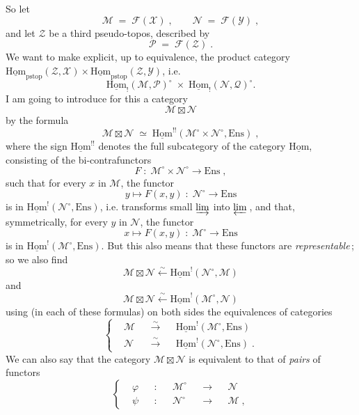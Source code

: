 \documentclass[11pt]{article}
\newcommand{\printedpage}[1]{\marginpar{\footnotesize p.~#1}}
\newcommand{\msp}[1]{\marginpar{\footnotesize [#1]}}
\newcommand{\uHom}{\underline{\mathrm{Hom}}}
\newcommand{\Ens}{\mathrm{Ens}}
\newcommand{\pstop}{\mathrm{pstop}}
\begin{document}
So let
\[
\mathcal{M} \;=\; \mathcal{F}(\mathcal{X})\;, \qquad \mathcal{N} \;=\; \mathcal{F}(\mathcal{Y})\;,
\tag*{(4.1.6)}
\]
and let $\mathcal{Z}$ be a third pseudo-topos, described by
\[
\mathcal{P} \;=\; \mathcal{F}(\mathcal{Z})\;.
\tag*{(4.1.7)}
\]
We want to make explicit, up to equivalence, the product category $\uHom_{\pstop}(\mathcal{Z},\mathcal{X})\times\uHom_{\pstop}(\mathcal{Z},\mathcal{Y})$, i.e.
\[
\uHom_!(\mathcal{M},\mathcal{P})^\circ \;\times\; \uHom_!(\mathcal{N},\mathcal{Q})^\circ.
\tag*{(4.1.8)}
\] %
I am going to introduce for this a category
\printedpage{3}
\msp{page 55}
\[
\mathcal{M}\boxtimes\mathcal{N}
\tag*{(4.1.9)}
\]
by the formula
\[
\mathcal{M}\boxtimes\mathcal{N} \;\simeq\; \uHom^{!!}(\mathcal{M}^\circ\times\mathcal{N}^\circ,\Ens)\;,
\tag*{(4.1.10)}
\]
where the sign $\uHom^{!!}$ denotes the full subcategory of the category $\uHom$, consisting of the bi-contrafunctors %
\[
F \;:\; \mathcal{M}^\circ\times\mathcal{N}^\circ \longrightarrow \Ens\;,
\tag*{(4.1.10.1)}
\]
such that for every $x$ in $\mathcal{M}$, the functor
\[
y \longmapsto F(x,y) \;:\; \mathcal{N}^\circ \longrightarrow \Ens
\tag*{(4.1.10.2)}
\]
is in $\uHom^!(\mathcal{N}^\circ,\Ens)$, i.e. transforms small $\varinjlim$ into $\varprojlim$\,, and that, symmetrically, for every $y$ in $\mathcal{N}$, the functor
\[
x \longmapsto F(x,y) \;:\; \mathcal{M}^\circ \longrightarrow \Ens
\tag*{(4.1.10.3)}
\]
is in $\uHom^!(\mathcal{M}^\circ,\Ens)$. But this also means that these functors are \textit{representable}\,; so we also find
\[
\mathcal{M}\boxtimes\mathcal{N} \xleftarrow{\sim} \uHom^!(\mathcal{N}^\circ,\mathcal{M})
\tag*{(4.1.11)}
\]
and
\[
\mathcal{M}\boxtimes\mathcal{N} \xleftarrow{\sim} \uHom^!(\mathcal{M}^\circ,\mathcal{N})
\tag*{(4.1.12)}
\]
\msp{page 56}
using (in each of these formulas) on both sides the equivalences of categories
\[
\left\{
\begin{aligned}
&\mathcal{M} &&\xrightarrow{\sim} &&\uHom^!(\mathcal{M}^\circ,\Ens)\\
&\mathcal{N} &&\xrightarrow{\sim} &&\uHom^!(\mathcal{N}^\circ,\Ens)\;.
\end{aligned}
\right.
\tag*{(4.1.13)}
\]
We can also say that the category $\mathcal{M}\boxtimes\mathcal{N}$ is equivalent to that of \textit{pairs} of functors
\[
\left\{
\begin{aligned}
&\varphi &&: &&\mathcal{M}^\circ &&\longrightarrow &&\mathcal{N}\\
&\psi &&: &&\mathcal{N}^\circ &&\longrightarrow &&\mathcal{M}\;,
\end{aligned}
\right.
\tag*{(4.1.14)}
\]
\end{document}
